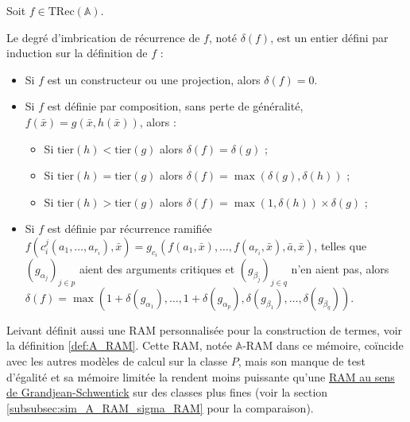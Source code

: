 \documentclass{report}
\newcommand{\bbA}{\mathbb{A}}
\newcommand{\TRec}[1]{\text{TRec}\left(\mathbb{#1}\right)}
\begin{document}
			\begin{definition}
				\label{def:degre_recurrence}
				
				Soit $f \in \TRec{A}$. 
				
				
				Le degré d'imbrication de récurrence de $f$, noté $\delta(f)$, est un entier défini par induction sur la définition de $f$ :
				
				\begin{itemize}[itemsep=-1mm]
					\item 	Si $f$ est un constructeur ou une projection, alors $\delta(f) = 0$.
					\item 	Si $f$ est définie par composition, sans perte de généralité, $f(\bar{x}) = g\left( \bar{x}, h\left( \bar{x}\right)\right)$, alors :
					
							\begin{itemize}[itemsep=-1mm]
								\item 	Si $\text{tier}(h) < \text{tier}(g)$ alors $\delta(f) = \delta(g)$ ;
								\item 	Si $\text{tier}(h) = \text{tier}(g)$ alors $\delta(f) = \max\left(\delta(g), \delta(h)\right)$ ;
								\item 	Si $\text{tier}(h) > \text{tier}(g)$ alors $\delta(f) = \max\left(1, \delta(h)\right) \times \delta(g)$ ;
							\end{itemize}
							
					\item 	Si $f$ est définie par récurrence ramifiée $f(c_i^j(a_1, \dots, a_{r_i}), \bar{x}) = g_{c_i}\left( f(a_1, \bar{x}), \dots, f(a_{r_i}, \bar{x}), \bar{a}, \bar{x} \right)$, telles que $\left( g_{\alpha_j}\right)_{j\in p}$ aient des arguments critiques et $\left( g_{\beta_j}\right)_{j\in q}$ n'en aient pas, alors $\delta(f) = \max\left( 1 + \delta\left( g_{\alpha_1} \right), \dots,  1 + \delta\left( g_{\alpha_p} \right), \delta\left( g_{\beta_1} \right), \dots,  \delta\left( g_{\beta_q} \right)\right)$. 
				\end{itemize}
			\end{definition}
			
			
			Leivant définit aussi une RAM personnalisée pour la construction de termes, voir la définition \ref{def:A_RAM}. Cette RAM, notée $\bbA$-RAM dans ce mémoire, coïncide avec les autres modèles de calcul sur la classe $P$, mais son manque de test d'égalité et sa mémoire limitée la rendent moins puissante qu'une \hyperref[def:sigma_RAM]{RAM au sens de Grandjean-Schwentick} \cite{GrandjeanSchwentick2002} sur des classes plus fines (voir la section \ref{subsubsec:sim_A_RAM_sigma_RAM} pour la comparaison).
			
\end{document}
